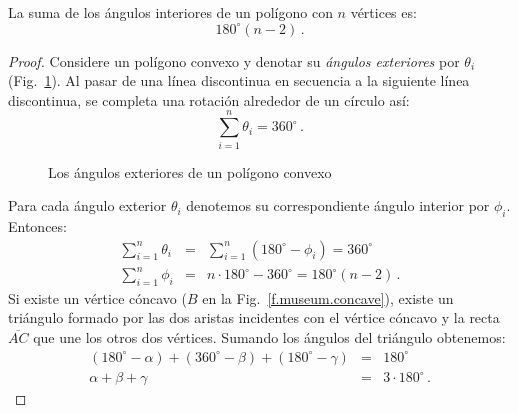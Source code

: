 \begin{theorem}\label{thm.interior-angles-of-a-polygon}
La suma de los ángulos interiores de un polígono con $n$ vértices es:
\[180^\circ(n-2)\,.\]
\end{theorem}
\begin{proof}
Considere un polígono convexo y denotar su \emph{ángulos exteriores} por $\theta_i$ (Fig.~\ref{f.museum.exterior}).
Al pasar de una línea discontinua en secuencia a la siguiente línea discontinua, se completa una rotación alrededor de un círculo así:
\[
\sum_{i=1}^n \theta_i = 360^\circ\,.
\]
\begin{figure}[t]
\begin{center}
\end{center}
\caption{Los ángulos exteriores de un polígono convexo}\label{f.museum.exterior}
\end{figure}
Para cada ángulo exterior $\theta_i$ denotemos su correspondiente ángulo interior por $\phi_i$. Entonces:
\begin{eqnarray*}
\displaystyle\sum_{i=1}^n \theta_i &=&\displaystyle\sum_{i=1}^n (180^\circ-\phi_i)= 360^\circ\\
\displaystyle\sum_{i=1}^n \phi_i &=& n\cdot 180^\circ-360^\circ =180^\circ(n-2)\,.
\end{eqnarray*}
Si existe un vértice cóncavo ($B$ en la Fig.~\ref{f.museum.concave}), existe un triángulo formado por las dos aristas incidentes con el vértice cóncavo y la recta $\overline{AC}$ que une los otros dos vértices. Sumando los ángulos del triángulo obtenemos:
\begin{eqnarray*}
(180^\circ - \alpha) + (360^\circ - \beta) + (180^\circ - \gamma) &=& 180^\circ\\
\alpha + \beta + \gamma &=& 3\cdot 180^\circ\,.
\end{eqnarray*}


\end{proof}
